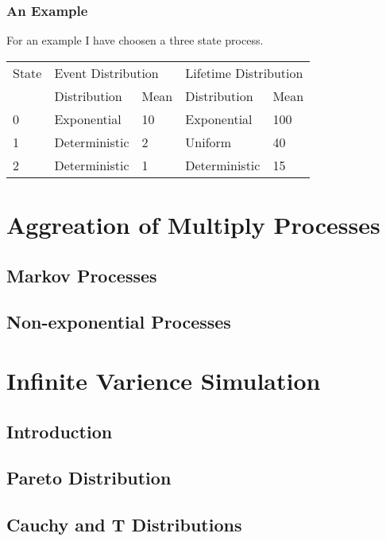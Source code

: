 \subsubsection{An Example}

For an example I have choosen a three state process.

\begin{tabular}{||l||l|l||l|l||} \hline
State & \multicolumn{2}{||l||}{Event Distribution} &
\multicolumn{2}{||l||}{Lifetime Distribution} \\
 & Distribution & Mean & Distribution & Mean \\ \hline \hline
0 & Exponential & 10 & Exponential & 100 \\ \hline
1 & Deterministic & 2 & Uniform & 40 \\ \hline
2 & Deterministic & 1 & Deterministic & 15 \\ \hline
\end{tabular}

\section{Aggreation of Multiply Processes}

\subsection{Markov Processes}

\subsection{Non-exponential Processes}

\section{Infinite Varience Simulation}

\subsection{Introduction}

\subsection{Pareto Distribution}

\subsection{Cauchy and T Distributions}

